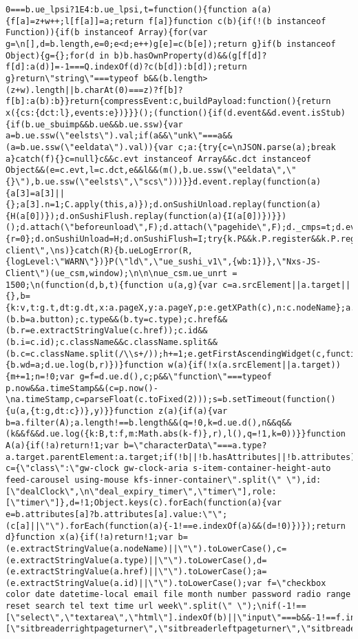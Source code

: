 \documentclass[
]{article}
\begin{document}
\begin{verbatim}
0===b.ue_lpsi?1E4:b.ue_lpsi,t=function(){function a(a){f[a]=z+w++;l[f[a]]=a;return f[a]}function c(b){if(!(b instanceof Function)){if(b instanceof Array){for(var g=\n[],d=b.length,e=0;e<d;e++)g[e]=c(b[e]);return g}if(b instanceof Object){g={};for(d in b)b.hasOwnProperty(d)&&(g[f[d]?f[d]:a(d)]=-1===Q.indexOf(d)?c(b[d]):b[d]);return g}return\"string\"===typeof b&&(b.length>(z+w).length||b.charAt(0)===z)?f[b]?f[b]:a(b):b}}return{compressEvent:c,buildPayload:function(){return x({cs:{dct:l},events:e})}}}();(function(){if(d.event&&d.event.isStub){if(b.ue_sbuimp&&b.ue&&b.ue.ssw){var a=b.ue.ssw(\"eelsts\").val;if(a&&\"unk\"===a&&(a=b.ue.ssw(\"eeldata\").val)){var c;a:{try{c=\nJSON.parse(a);break a}catch(f){}c=null}c&&c.evt instanceof Array&&c.dct instanceof Object&&(e=c.evt,l=c.dct,e&&l&&(m(),b.ue.ssw(\"eeldata\",\"{}\"),b.ue.ssw(\"eelsts\",\"scs\")))}}d.event.replay(function(a){a[3]=a[3]||{};a[3].n=1;C.apply(this,a)});d.onSushiUnload.replay(function(a){H(a[0])});d.onSushiFlush.replay(function(a){I(a[0])})}})();d.attach(\"beforeunload\",F);d.attach(\"pagehide\",F);d._cmps=t;d.event=C;d.event.reset=function(){r=0};d.onSushiUnload=H;d.onSushiFlush=I;try{k.P&&k.P.register&&k.P.register(\"sushi-client\",\ns)}catch(R){b.ueLogError(R,{logLevel:\"WARN\"})}P(\"ld\",\"ue_sushi_v1\",{wb:1})},\"Nxs-JS-Client\")(ue_csm,window);\n\n\nue_csm.ue_unrt = 1500;\n(function(d,b,t){function u(a,g){var c=a.srcElement||a.target||{},b={k:v,t:g.t,dt:g.dt,x:a.pageX,y:a.pageY,p:e.getXPath(c),n:c.nodeName};a.button&&(b.b=a.button);c.type&&(b.ty=c.type);c.href&&(b.r=e.extractStringValue(c.href));c.id&&(b.i=c.id);c.className&&c.className.split&&(b.c=c.className.split(/\\s+/));h+=1;e.getFirstAscendingWidget(c,function(a){b.wd=a;d.ue.log(b,r)})}function w(a){if(!x(a.srcElement||a.target)){m+=1;n=!0;var g=f=d.ue.d(),c;p&&\"function\"===typeof p.now&&a.timeStamp&&(c=p.now()-\na.timeStamp,c=parseFloat(c.toFixed(2)));s=b.setTimeout(function(){u(a,{t:g,dt:c})},y)}}function z(a){if(a){var b=a.filter(A);a.length!==b.length&&(q=!0,k=d.ue.d(),n&&q&&(k&&f&&d.ue.log({k:B,t:f,m:Math.abs(k-f)},r),l(),q=!1,k=0))}}function A(a){if(!a)return!1;var b=\"characterData\"===a.type?a.target.parentElement:a.target;if(!b||!b.hasAttributes||!b.attributes)return!1;var c={\"class\":\"gw-clock gw-clock-aria s-item-container-height-auto feed-carousel using-mouse kfs-inner-container\".split(\" \"),id:[\"dealClock\",\n\"deal_expiry_timer\",\"timer\"],role:[\"timer\"]},d=!1;Object.keys(c).forEach(function(a){var e=b.attributes[a]?b.attributes[a].value:\"\";(c[a]||\"\").forEach(function(a){-1!==e.indexOf(a)&&(d=!0)})});return d}function x(a){if(!a)return!1;var b=(e.extractStringValue(a.nodeName)||\"\").toLowerCase(),c=(e.extractStringValue(a.type)||\"\").toLowerCase(),d=(e.extractStringValue(a.href)||\"\").toLowerCase();a=(e.extractStringValue(a.id)||\"\").toLowerCase();var f=\"checkbox color date datetime-local email file month number password radio range reset search tel text time url week\".split(\" \");\nif(-1!==[\"select\",\"textarea\",\"html\"].indexOf(b)||\"input\"===b&&-1!==f.indexOf(c)||\"a\"===b&&-1!==d.indexOf(\"http\")||-1!==[\"sitbreaderrightpageturner\",\"sitbreaderleftpageturner\",\"sitbreaderpagecontainer\"].indexOf(a))return!0}function 
\end{verbatim}
\end{document}
